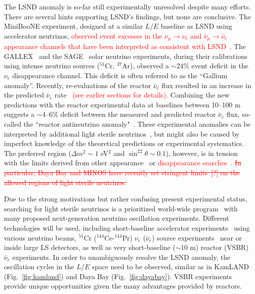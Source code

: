 \documentclass[aps,twocolumn,preprintnumbers,amsmath,superscriptaddress,amssymb,floats,nofootinbib]{revtex4-1}
\begin{document}
The LSND anomaly is so-far still experimentally unresolved despite many efforts. 
There are several hints supporting LSND's findings, but none are conclusive.
The MiniBooNE experiment, designed at a similar $L/E$ baseline as LSND using accelerator neutrinos, \textcolor{red}{observed event excesses in the $\nu_{\mu}\rightarrow\nu_e$ and $\bar\nu_{\mu}\rightarrow\bar\nu_e$ appearance channels that have been interpreted as consistent with LSND~\cite{MiniBooNE2007,MiniBooNE2013}.} 
The GALLEX~\cite{GALLEX2010} and the SAGE~\cite{SAGE2009} solar neutrino experiments, during their calibrations using intense neutrino sources ($^{51}$Cr, $^{37}$Ar), observed a $\sim$24\% event deficit in the $\nu_e$ disappearance channel. 
This deficit is often referred to as the ``Gallium anomaly''. 
Recently, re-evaluations of the reactor $\bar\nu_e$ flux resulted in an increase in the predicted $\bar\nu_e$ rate~\cite{Mueller, Huber} \textcolor{red}{(see earlier sections for details).} 
Combining the new predictions with the reactor experimental data at baselines between 10--100 m~\cite{ILL,Gosgen,Rovno,Krasnoyarsk,SRP,Bugey4,Bugey3} suggests a $\sim$4--6\% deficit between the measured and predicted reactor $\bar\nu_e$ flux, so-called the ``reactor antineutrino anomaly"~\cite{Mention,Zhang13}. 
These experimental anomalies can be interpreted by additional light sterile neutrinos~\cite{Guinti2011}, but might also be caused by imperfect knowledge of the theoretical predictions or experimental systematics.  
The preferred region ($\Delta{m}^2\sim1$ eV$^2$ and $\sin^22\theta\sim0.1$), however, is in tension with the limits derived from other appearance~\cite{KARMEN2002,NOMAD03,OPERA13,ICARUS13} or \textcolor{red}{disappearance searches~\cite{Stockdale84,Dydak84,MiniBooNE12-nubar,MiniBooNE12-nu,SuperK2000,MINOS11-NC,Bugey3,Conrad12,Sousa-Neutrino14,DayaBaySterile}.} \textcolor{red}{\st{In particular, Daya Bay and MINOS have recently set stringent limits~[?] on the allowed regions of light sterile neutrinos.}}

Due to the strong motivations but rather confusing present experimental status, searching for light sterile neutrinos is a prioritized world-wide program~\cite{sterileWP} with many proposed next-generation neutrino oscillation experiments.
Different technologies will be used, including short-baseline accelerator experiments~\cite{IsoDAR,OscSNS,NESSiE,LAr1-ND,nuSTORM} using various neutrino beams, $^{51}$Cr ($^{144}$Ce-$^{144}$Pr) $\nu_e$ ($\bar\nu_e$) source experiments~\cite{Cribier2011,Dwyer2013,SOX,CeLAND} near or inside large LS detectors, as well as very short-baseline ($\sim10$ m) reactor (VSBR) $\bar\nu_e$ experiments. 
In order to unambiguously resolve the LSND anomaly, the oscillation cycles in the $L/E$ space need to be observed, similar as in KamLAND (Fig.~\ref{fig:kamland}) and Daya Bay (Fig.~\ref{fig:dayabay}). VSBR experiments provide unique opportunities given the many advantages provided by reactors.
\end{document}
